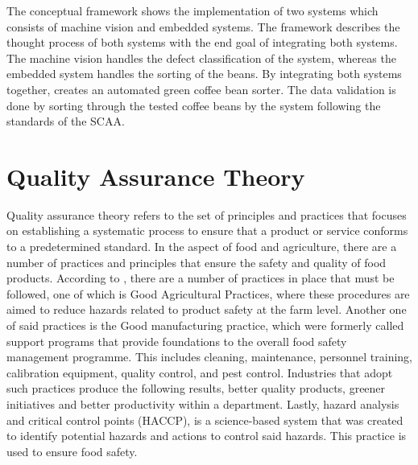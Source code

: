 The conceptual framework shows the implementation of two systems which consists of machine vision and embedded systems. The framework describes the thought process of both systems with the end goal of integrating both systems. The machine vision handles the defect classification of the system, whereas the embedded system handles the sorting of the beans. By integrating both systems together, creates an automated green coffee bean sorter. The data validation is done by sorting through the tested coffee beans by the system following the standards of the SCAA.

\section{Quality Assurance Theory}
Quality assurance theory refers to the set of principles and practices that focuses on establishing a systematic process to ensure that a product or service conforms to a predetermined standard. In the aspect of food and agriculture, there are a number of practices and principles that ensure the safety and quality of food products. According to \cite{da_Cruz_Cenci_Maia_2006}, there are a number of practices in place that must be followed, one of which is Good Agricultural Practices, where these procedures are aimed to reduce hazards related to product safety at the farm level. Another one of said practices is the Good manufacturing practice, which were formerly called support programs that provide foundations to the overall food safety management programme. This includes cleaning, maintenance, personnel training, calibration equipment, quality control, and  pest control. Industries that adopt such practices produce the following results, better quality products, greener initiatives and better productivity within a department. Lastly, hazard analysis and critical control points (HACCP), is a science-based system that was created to identify potential hazards and actions to control said hazards. This practice is used to ensure food safety. 


